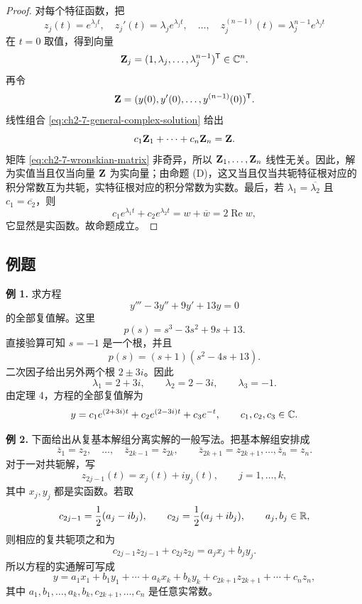 \begin{proof}
对每个特征函数，把
\[
 z_j(t)=e^{\lambda_jt},
 \quad
 z_j'(t)=\lambda_je^{\lambda_jt},
 \quad\ldots,\quad
 z_j^{(n-1)}(t)=\lambda_j^{n-1}e^{\lambda_jt}
\]
在 \(t=0\) 取值，得到向量
\[
 \vect{Z}_j=(1,\lambda_j,\ldots,\lambda_j^{n-1})^{\mathsf T}\in\C^n.
\]
再令
\[
 \vect{Z}=(y(0),y'(0),\ldots,y^{(n-1)}(0))^{\mathsf T}.
\]
线性组合 \eqref{eq:ch2-7-general-complex-solution} 给出
\[
 c_1\vect{Z}_1+\cdots+c_n\vect{Z}_n=\vect{Z}.
\]
矩阵 \eqref{eq:ch2-7-wronskian-matrix} 非奇异，所以 \(\vect{Z}_1,\ldots,\vect{Z}_n\) 线性无关。因此，解为实值当且仅当向量 \(\vect{Z}\) 为实向量；由命题 (D)，这又当且仅当共轭特征根对应的积分常数互为共轭，实特征根对应的积分常数为实数。最后，若 \(\lambda_1=\overline{\lambda_2}\) 且 \(c_1=\overline{c_2}\)，则
\[
 c_1e^{\lambda_1t}+c_2e^{\lambda_2t}
 =w+\overline w=2\operatorname{Re}w,
\]
它显然是实函数。故命题成立。
\end{proof}

\subsection*{例题}

\noindent\textbf{例 1.}
求方程
\begin{equation}
 y''' -3y''+9y'+13y=0
 \label{eq:ch2-7-example1}
\end{equation}
的全部复值解。这里
\[
 p(s)=s^3-3s^2+9s+13.
\]
直接验算可知 \(s=-1\) 是一个根，并且
\[
 p(s)=(s+1)(s^2-4s+13).
\]
二次因子给出另外两个根 \(2\pm3i\)。因此
\[
 \lambda_1=2+3i,\qquad
 \lambda_2=2-3i,\qquad
 \lambda_3=-1.
\]
由定理 4，方程的全部复值解为
\begin{equation}
 y=c_1e^{(2+3i)t}+c_2e^{(2-3i)t}+c_3e^{-t},
 \qquad c_1,c_2,c_3\in\mathbb C.
 \label{eq:ch2-7-example1-complex-general}
\end{equation}

\noindent\textbf{例 2.}
下面给出从复基本解组分离实解的一般写法。把基本解组安排成
\[
 \overline z_1=z_2,\quad\ldots,\quad
 \overline z_{2k-1}=z_{2k},
 \qquad
 \overline z_{2k+1}=z_{2k+1},\ldots,
 \overline z_n=z_n.
\]
对于一对共轭解，写
\[
 z_{2j-1}(t)=x_j(t)+iy_j(t),
 \qquad j=1,\ldots,k,
\]
其中 \(x_j,y_j\) 都是实函数。若取
\begin{equation}
 c_{2j-1}=\frac12(a_j-ib_j),
 \qquad
 c_{2j}=\frac12(a_j+ib_j),
 \qquad a_j,b_j\in\mathbb R,
 \label{eq:ch2-7-example2-real-constants}
\end{equation}
则相应的复共轭项之和为
\[
 c_{2j-1}z_{2j-1}+c_{2j}z_{2j}
 =a_jx_j+b_jy_j.
\]
所以方程的实通解可写成
\begin{equation}
 y=a_1x_1+b_1y_1+\cdots+a_kx_k+b_ky_k
 +c_{2k+1}z_{2k+1}+\cdots+c_nz_n,
 \label{eq:ch2-7-example2-real-general}
\end{equation}
其中 \(a_1,b_1,\ldots,a_k,b_k,c_{2k+1},\ldots,c_n\) 是任意实常数。

